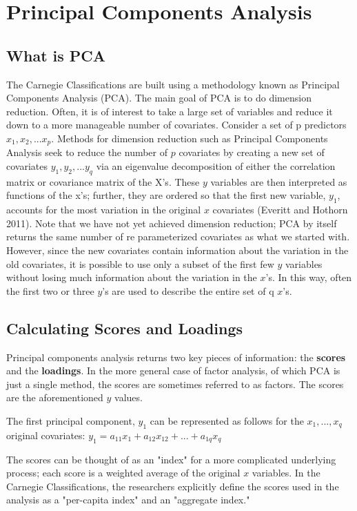 \documentclass{article}
\begin{document}
\section{Principal Components Analysis}
\subsection{What is PCA}
The Carnegie Classifications are built using a methodology known as Principal Components Analysis (PCA). The main goal of PCA is to do dimension reduction. Often, it is of interest to take a large set of variables and reduce it down to a more manageable number of covariates. Consider a set of p predictors $x_1, x_2,...x_p$. Methods for dimension reduction such as Principal Components Analysis seek to reduce the number of $p$ covariates by creating a new set of covariates $y_1, y_2,...y_q$ via an eigenvalue decomposition of either the correlation matrix or covariance matrix of the X's. These $y$ variables are then interpreted as functions of the x's; further, they are ordered so that the first new variable, $y_1$, accounts for the most variation in the original $x$ covariates (Everitt and Hothorn 2011). Note that we have not yet achieved dimension reduction; PCA by itself returns the same number of re parameterized covariates as what we started with. However, since the new covariates contain information about the variation in the old covariates, it is possible to use only a subset of the first few $y$ variables without losing much information about the variation in the $x$'s.  In this way, often the first two or three $y$'s are used to describe the entire set of q $x$'s.

\subsection{Calculating Scores and  Loadings}
Principal components analysis returns two key pieces of information: the \textbf{scores} and the \textbf{loadings}. In the more general case of factor analysis, of which PCA is just a single method, the scores are sometimes referred to as factors. The scores are the aforementioned $y$ values.  

The first principal component, $y_1$ can be represented as follows for the $x_{1},...,x_{q}$ original covariates:
$y_1 = a_{11}x_{1} + a_{12}x_{12} + ... + a_{1q}x_{q}$ 

The scores can be thought of as an "index" for a more complicated underlying process; each score is a weighted average of the original $x$ variables. In the Carnegie Classifications, the researchers explicitly define the scores used in the analysis as a "per-capita index" and an "aggregate index."  
\end{document}
